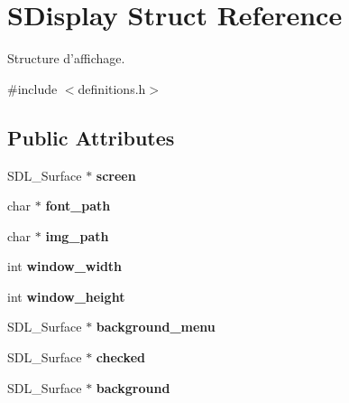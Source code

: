 \hypertarget{structSDisplay}{
\section{SDisplay Struct Reference}
\label{structSDisplay}
}


Structure d'affichage.  




{\ttfamily \#include $<$definitions.h$>$}

\subsection*{Public Attributes}
\begin{DoxyCompactItemize}
\item 
\hypertarget{structSDisplay_af09a4500566aa0131a075a1bac5771ee}{
SDL\_\-Surface $\ast$ {\bfseries screen}}
\label{structSDisplay_af09a4500566aa0131a075a1bac5771ee}

\item 
\hypertarget{structSDisplay_a493f17d89e2f82983d42c9e4fd34a8ae}{
char $\ast$ {\bfseries font\_\-path}}
\label{structSDisplay_a493f17d89e2f82983d42c9e4fd34a8ae}

\item 
\hypertarget{structSDisplay_abd654cbf33a0eb53d2985ecebe984fe4}{
char $\ast$ {\bfseries img\_\-path}}
\label{structSDisplay_abd654cbf33a0eb53d2985ecebe984fe4}

\item 
\hypertarget{structSDisplay_ae509b9c6c0706ba14a8e9736dad99fd9}{
int {\bfseries window\_\-width}}
\label{structSDisplay_ae509b9c6c0706ba14a8e9736dad99fd9}

\item 
\hypertarget{structSDisplay_a55ab323c12a663427f2792fdfea3a446}{
int {\bfseries window\_\-height}}
\label{structSDisplay_a55ab323c12a663427f2792fdfea3a446}

\item 
\hypertarget{structSDisplay_a599babf7e962dd2221e5f51c54ec73f7}{
SDL\_\-Surface $\ast$ {\bfseries background\_\-menu}}
\label{structSDisplay_a599babf7e962dd2221e5f51c54ec73f7}

\item 
\hypertarget{structSDisplay_aaddc24383d40b6c09139eded4f60158f}{
SDL\_\-Surface $\ast$ {\bfseries checked}}
\label{structSDisplay_aaddc24383d40b6c09139eded4f60158f}

\item 
\hypertarget{structSDisplay_a1bae72643f0ba4f1806a4b686b92c421}{
SDL\_\-Surface $\ast$ {\bfseries background}}
\label{structSDisplay_a1bae72643f0ba4f1806a4b686b92c421}


\end{DoxyCompactItemize}
